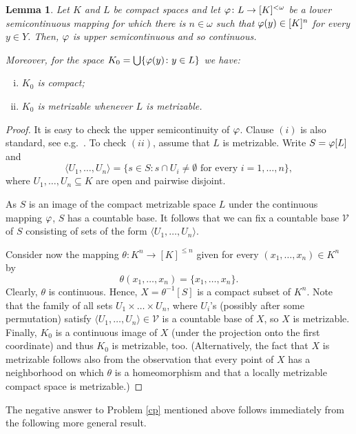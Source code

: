 \documentclass[12pt,fleqn]{amsart}
\numberwithin{equation}{section}
\newtheorem{lemma}[thm]{Lemma}
\theoremstyle{definition}
\def\V{\mathcal V}
\def\la{\langle}
\def\ra{\rangle}
\newcommand{\sub}{\subseteq}
\begin{document}
\begin{lemma}\label{usc}
Let $K$ and $L$ be compact spaces and let $\varphi\colon L\to [K]^{<\omega}$ be a lower semicontinuous mapping for which
 there is $n\in\omega$ such that $\varphi(y)\in [K]^n$ for every $y\in Y$. Then, $\varphi$ is upper semicontinuous and so continuous.%

Moreover, for the space $K_0=\bigcup \{\varphi(y)\colon y\in L\}$ we have:
\begin{enumerate}[(i)]
\item $K_0$ is compact;
\item $K_0$ is metrizable whenever $L$ is metrizable.
\end{enumerate}
\end{lemma}

\begin{proof}
It is easy to check the upper semicontinuity of $\varphi$. Clause $(i)$ is also standard, see e.g.\ \cite[Proposition 3.1]{Pl14}.
To check $(ii)$, assume that $L$ is metrizable. Write $S=\varphi[L]$ and
\[ \la U_1,\ldots, U_n\ra=\{s\in S\colon s\cap U_i\neq\emptyset\mbox{ for every } i=1,\ldots,n\},\]
where $U_1,\ldots,U_n\sub K$ are open and pairwise disjoint.

As $S$ is an image of the compact metrizable space $L$ under the continuous mapping $\varphi$,
$S$ has a countable base. It follows that we can fix a countable base $\V$ of $S$ consisting of
sets of the form $\la U_1,\ldots, U_n\ra $.

Consider now the mapping $\theta\colon K^n\to [K]^{\le n}$ given for every $(x_1,\ldots, x_n)\in K^n$ by 
\[ \theta(x_1,\ldots, x_n)=\{x_1,\ldots, x_n\}.\]
Clearly, $\theta $ is continuous. Hence,  $X=\theta^{-1}[S]$ is a compact subset of $K^n$.
Note that the family of all sets  $U_1\times\ldots\times U_n$, where $U_i$'s (possibly after some permutation) satisfy  $\la U_1,\ldots, U_n\ra\in\V$ 
is a countable base of $X$, so $X$ is metrizable. Finally, $K_0$ is a continuous image of $X$ (under the projection onto the first coordinate) and thus $K_0$ is metrizable, too.
%
%
(Alternatively, the fact that $X$ is metrizable follows also from the observation that every point of $X$ has a neighborhood on which $\theta$ is a homeomorphism  and that a locally metrizable compact space is metrizable.)
\end{proof}


The negative answer to Problem \ref{cp} mentioned above follows immediately from the
following more general result. 
\end{document}
